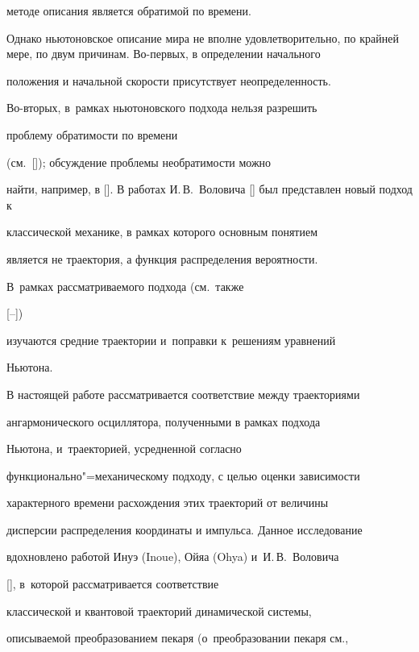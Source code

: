 методе описания является обратимой по времени.



Однако ньютоновское описание мира не вполне удовлетворительно,  по крайней мере, по двум причинам. Во-первых, в определении начального

положения и начальной скорости присутствует неопределенность.

Во-вторых, в~рамках ньютоновского подхода нельзя разрешить

проблему обратимости по времени

(см.~[]); обсуждение проблемы необратимости можно

найти, например, в []. В работах И.\,В.~Воловича [] был представлен новый подход к

классической механике, в рамках которого основным понятием

является не траектория, а функция распределения вероятности. 

В~рамках рассматриваемого подхода (см.~также

[--])

изучаются средние траектории и~поправки к~решениям уравнений

Ньютона.



В настоящей работе рассматривается соответствие между траекториями

ангармонического осциллятора, полученными в рамках подхода

Ньютона, и~траекторией, усредненной согласно

функционально"=механическому подходу, с целью оценки зависимости

характерного времени расхождения этих траекторий от величины

дисперсии распределения координаты и импульса. Данное исследование

вдохновлено работой Инуэ (Inoue), Ойяа (Ohya) и~И.\,В.~Воловича

[], в~которой рассматривается соответствие

классической и квантовой траекторий динамической системы,

описываемой преобразованием пекаря (о~преобразовании пекаря см.,

